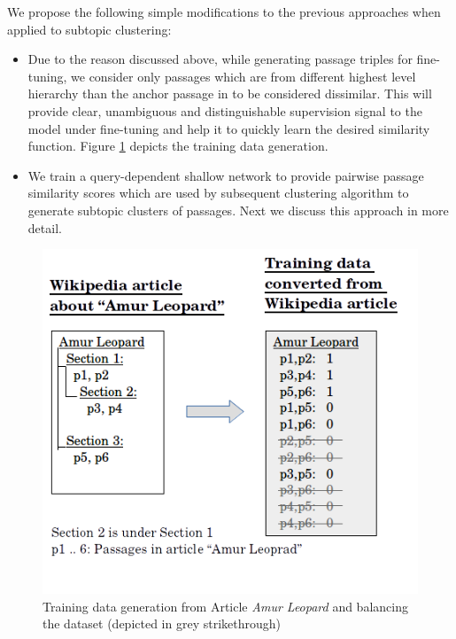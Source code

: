 \documentclass[sigconf,authordraft]{acmart}
\begin{document}
We propose the following simple modifications to the previous approaches when applied to subtopic clustering:
\begin{itemize}
    \item Due to the reason discussed above, while generating passage triples for fine-tuning, we consider only passages which are from different highest level hierarchy than the anchor passage in to be considered dissimilar. This will provide clear, unambiguous and distinguishable supervision signal to the model under fine-tuning and help it to quickly learn the desired similarity function. Figure \ref{fig:conv} depicts the training data generation.
    \item We train a query-dependent shallow network to provide pairwise passage similarity scores which are used by subsequent clustering algorithm to generate subtopic clusters of passages. Next we discuss this approach in more detail.
\end{itemize}{}
\begin{figure}[h]
  \centering
  \includegraphics[width=\linewidth]{graphics/car_y1_conv.png}
  \caption{Training data generation from Article \textit{Amur Leopard} and balancing the dataset (depicted in grey strikethrough)}
  \label{fig:conv}
\end{figure}
\end{document}

